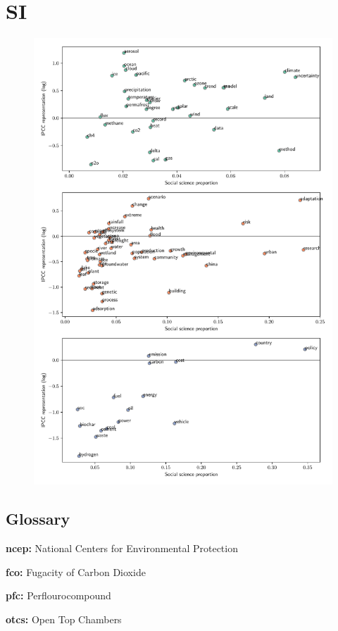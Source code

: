 \documentclass{article}
\begin{document}
\section{SI}
\begin{figure}[h!]
	\begin{center}
		\includegraphics[width=0.85\linewidth]{plots/run_1771_wgs_socsci.pdf}
		\caption{}
		\label{ipcc_rep}
	\end{center}
\end{figure}


\subsection{Glossary}


\noindent\textbf{ncep:} National Centers for Environmental Protection

\noindent\textbf{fco:} Fugacity of Carbon Dioxide

\noindent\textbf{pfc:} Perflourocompound
	
\noindent\textbf{otcs:} Open Top Chambers
\end{document}
